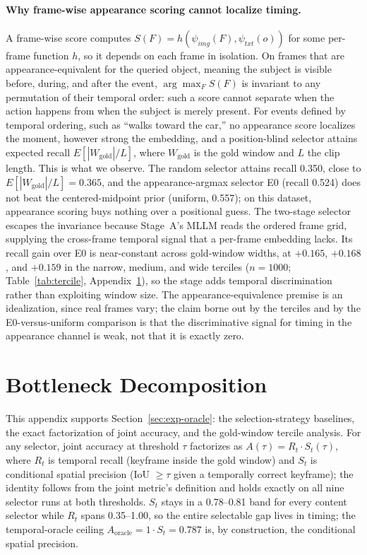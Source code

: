 \documentclass[10pt]{article}
\begin{document}
\paragraph{Why frame-wise appearance scoring cannot localize timing.} A frame-wise score computes $S(F) = h(\psi_{img}(F), \psi_{txt}(o))$ for some per-frame function $h$, so it depends on each frame in isolation. On frames that are appearance-equivalent for the queried object, meaning the subject is visible before, during, and after the event, $\arg\max_F S(F)$ is invariant to any permutation of their temporal order: such a score cannot separate when the action happens from when the subject is merely present. For events defined by temporal ordering, such as ``walks toward the car,'' no appearance score localizes the moment, however strong the embedding, and a position-blind selector attains expected recall $E[|W_{\mathrm{gold}}|/L]$, where $W_{\mathrm{gold}}$ is the gold window and $L$ the clip length. This is what we observe. The random selector attains recall 0.350, close to $E[|W_{\mathrm{gold}}|/L] = 0.365$, and the appearance-argmax selector E0 (recall 0.524) does not beat the centered-midpoint prior (uniform, 0.557); on this dataset, appearance scoring buys nothing over a positional guess. The two-stage selector escapes the invariance because Stage~A's MLLM reads the ordered frame grid, supplying the cross-frame temporal signal that a per-frame embedding lacks. Its recall gain over E0 is near-constant across gold-window widths, at $+0.165$, $+0.168$, and $+0.159$ in the narrow, medium, and wide terciles ($n=1000$; Table~\ref{tab:tercile}, Appendix~\ref{app:decomp}), so the stage adds temporal discrimination rather than exploiting window size. The appearance-equivalence premise is an idealization, since real frames vary; the claim borne out by the terciles and by the E0-versus-uniform comparison is that the discriminative signal for timing in the appearance channel is weak, not that it is exactly zero.

\section{Bottleneck Decomposition}\label{app:decomp}

This appendix supports Section~\ref{sec:exp-oracle}: the selection-strategy baselines, the exact factorization of joint accuracy, and the gold-window tercile analysis. For any selector, joint accuracy at threshold $\tau$ factorizes as $A(\tau) = R_t \cdot S_t(\tau)$, where $R_t$ is temporal recall (keyframe inside the gold window) and $S_t$ is conditional spatial precision (IoU $\ge \tau$ given a temporally correct keyframe); the identity follows from the joint metric's definition and holds exactly on all nine selector runs at both thresholds. $S_t$ stays in a 0.78--0.81 band for every content selector while $R_t$ spans 0.35--1.00, so the entire selectable gap lives in timing; the temporal-oracle ceiling $A_{\mathrm{oracle}} = 1 \cdot S_t = 0.787$ is, by construction, the conditional spatial precision.
\end{document}
